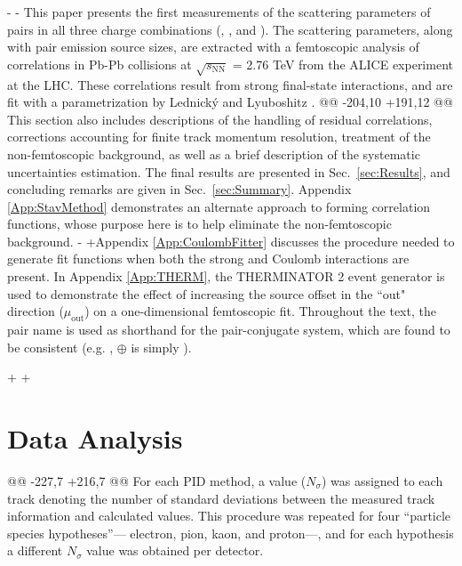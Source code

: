 -%
-
 This paper presents the first measurements of the scattering parameters of \LamK pairs in all three charge combinations (\LamKchP, \LamKchM, and \LamKs).
 The scattering parameters, along with pair emission source sizes, are extracted with a femtoscopic analysis of \LamK correlations in Pb-Pb collisions at $\sqrt{s_{\mathrm{NN}}}$ = 2.76 TeV from the ALICE experiment at the LHC.  
 These correlations result from strong final-state interactions, and are fit with a parametrization by Lednick\'y and Lyuboshitz \cite{Lednicky:82}.  
@@ -204,10 +191,12 @@
 This section also includes descriptions of the handling of residual correlations, corrections accounting for finite track momentum resolution, treatment of the non-femtoscopic background, as well as a brief description of the systematic uncertainties estimation.  
 The final results are presented in Sec.\ \ref{sec:Results}, and concluding remarks are given in Sec.\ \ref{sec:Summary}.
 Appendix \ref{App:StavMethod} demonstrates an alternate approach to forming correlation functions, whose purpose here is to help eliminate the non-femtoscopic background.
-%
+Appendix \ref{App:CoulombFitter} discusses the procedure needed to generate fit functions when both the strong and Coulomb interactions are present.
 In Appendix \ref{App:THERM}, the THERMINATOR 2 event generator is used to demonstrate the effect of increasing the source offset in the ``out" direction ($\mu_{\mathrm{out}}$) on a one-dimensional femtoscopic fit.
 Throughout the text, the pair name is used as shorthand for the pair-conjugate system, which are found to be consistent (e.g. \LamKs, \LamKchP $\oplus$ \ALamKchM is simply \LamKchP).
 
+%
+%
 \section{Data Analysis}
 \label{sec:DataAnalysis}
 
@@ -227,7 +216,7 @@
 For each PID method, a value ($N_{\sigma}$) was assigned to each track denoting the number of standard deviations between the measured track information and calculated values.  
 This procedure was repeated for four ``particle species hypotheses''--- electron, pion, kaon, and proton---, and for each hypothesis a different $N_{\sigma}$ value was obtained per detector.
 
